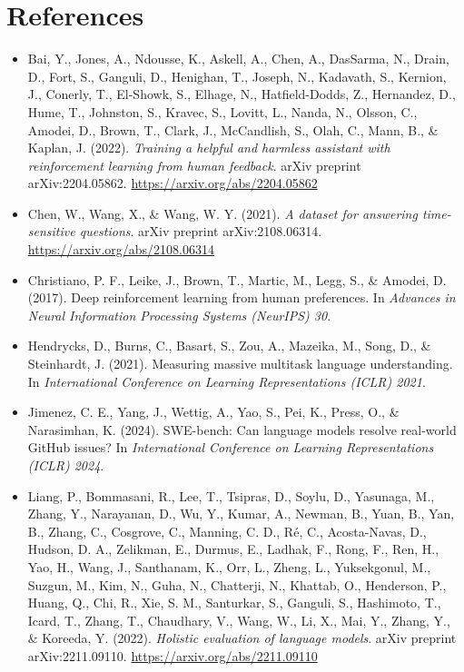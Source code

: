 \documentclass[11pt]{article}
\begin{document}
\section*{References}
\begin{itemize}[leftmargin=*, label={}]
\item Bai, Y., Jones, A., Ndousse, K., Askell, A., Chen, A., DasSarma, N., Drain, D., Fort, S., Ganguli, D., Henighan, T., Joseph, N., Kadavath, S., Kernion, J., Conerly, T., El-Showk, S., Elhage, N., Hatfield-Dodds, Z., Hernandez, D., Hume, T., Johnston, S., Kravec, S., Lovitt, L., Nanda, N., Olsson, C., Amodei, D., Brown, T., Clark, J., McCandlish, S., Olah, C., Mann, B., \& Kaplan, J. (2022). \emph{Training a helpful and harmless assistant with reinforcement learning from human feedback}. arXiv preprint arXiv:2204.05862. \url{https://arxiv.org/abs/2204.05862}

\item Chen, W., Wang, X., \& Wang, W. Y. (2021). \emph{A dataset for answering time-sensitive questions}. arXiv preprint arXiv:2108.06314. \url{https://arxiv.org/abs/2108.06314}

\item Christiano, P. F., Leike, J., Brown, T., Martic, M., Legg, S., \& Amodei, D. (2017). Deep reinforcement learning from human preferences. In \emph{Advances in Neural Information Processing Systems (NeurIPS) 30}.

\item Hendrycks, D., Burns, C., Basart, S., Zou, A., Mazeika, M., Song, D., \& Steinhardt, J. (2021). Measuring massive multitask language understanding. In \emph{International Conference on Learning Representations (ICLR) 2021}.

\item Jimenez, C. E., Yang, J., Wettig, A., Yao, S., Pei, K., Press, O., \& Narasimhan, K. (2024). SWE-bench: Can language models resolve real-world GitHub issues? In \emph{International Conference on Learning Representations (ICLR) 2024}.

\item Liang, P., Bommasani, R., Lee, T., Tsipras, D., Soylu, D., Yasunaga, M., Zhang, Y., Narayanan, D., Wu, Y., Kumar, A., Newman, B., Yuan, B., Yan, B., Zhang, C., Cosgrove, C., Manning, C. D., R\'e, C., Acosta-Navas, D., Hudson, D. A., Zelikman, E., Durmus, E., Ladhak, F., Rong, F., Ren, H., Yao, H., Wang, J., Santhanam, K., Orr, L., Zheng, L., Yuksekgonul, M., Suzgun, M., Kim, N., Guha, N., Chatterji, N., Khattab, O., Henderson, P., Huang, Q., Chi, R., Xie, S. M., Santurkar, S., Ganguli, S., Hashimoto, T., Icard, T., Zhang, T., Chaudhary, V., Wang, W., Li, X., Mai, Y., Zhang, Y., \& Koreeda, Y. (2022). \emph{Holistic evaluation of language models}. arXiv preprint arXiv:2211.09110. \url{https://arxiv.org/abs/2211.09110}


\end{itemize}
\end{document}
